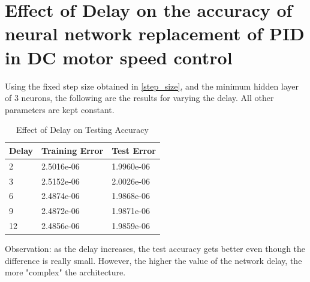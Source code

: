 \documentclass{article}
\begin{document}
\section{Effect of Delay on the accuracy of neural network replacement of PID in DC motor speed control}
Using the fixed step size obtained in \ref{step_size}, and the minimum hidden layer of 3 neurons, the following are the results for varying the delay. All other parameters are kept constant.
\begin{table}[H]
\centering
\caption{\label{tab3}Effect of Delay on  Testing Accuracy}
\begin{tabular}{|l|l|l|}
\hline
Delay & Training Error & Test Error \\ \hline
2     & 2.5016e-06     & 1.9960e-06 \\ \hline
3     & 2.5152e-06     & 2.0026e-06 \\ \hline
6     & 2.4874e-06     & 1.9868e-06 \\ \hline
9     & 2.4872e-06     & 1.9871e-06 \\ \hline
12    & 2.4856e-06     & 1.9859e-06 \\ \hline
\end{tabular}
\end{table}
Observation: as the delay increases, the test accuracy gets better even though the difference is really small. However, the higher the value of the network delay, the more "complex" the architecture.
\end{document}
